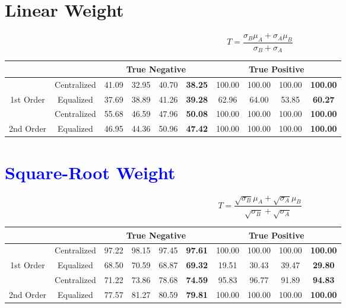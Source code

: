 \documentclass[10pt,a4paper]{article}
\begin{document}
	
	\section{Linear Weight}
		$$T = \frac{\sigma_B \mu_A + \sigma_A \mu_B}{\sigma_B + \sigma_A}$$
		
		\begin{table}[!h]
			\centering
			\begin{tabular}{|c|c|c|c|c|c|c|c|c|c|}
				\hline
				&             & \multicolumn{4}{c|}{True Negative}                            & \multicolumn{4}{c|}{True Positive}                                \\ \hline
				& Centralized & 41.09 & 32.95 & 40.70 & {\color[HTML]{FE0000} \textbf{38.25}} & 100.00 & 100.00 & 100.00 & {\color[HTML]{FE0000} \textbf{100.00}} \\ \cline{2-10} 
				\multirow{-2}{*}{1st Order} & Equalized   & 37.69 & 38.89 & 41.26 & {\color[HTML]{FE0000} \textbf{39.28}} & 62.96  & 64.00  & 53.85  & {\color[HTML]{FE0000} \textbf{60.27}}  \\ \hline
				& Centralized & 55.68 & 46.59 & 47.96 & {\color[HTML]{FE0000} \textbf{50.08}} & 100.00 & 100.00 & 100.00 & {\color[HTML]{FE0000} \textbf{100.00}} \\ \cline{2-10} 
				\multirow{-2}{*}{2nd Order} & Equalized   & 46.95 & 44.36 & 50.96 & {\color[HTML]{FE0000} \textbf{47.42}} & 100.00 & 100.00 & 100.00 & {\color[HTML]{FE0000} \textbf{100.00}} \\ \hline
			\end{tabular}
		\end{table}
	
	\section{\textcolor{blue}{Square-Root Weight}}
		$$T = \frac{\sqrt{\sigma_B} \mu_A + \sqrt{\sigma_A} \mu_B}{\sqrt{\sigma_B} + \sqrt{\sigma_A}}$$
		\begin{table}[!h]
			\centering
			\begin{tabular}{|c|c|c|c|c|c|c|c|c|c|}
				\hline
				&             & \multicolumn{4}{c|}{True Negative}                            & \multicolumn{4}{c|}{True Positive}                                \\ \hline
				& Centralized & 97.22 & 98.15 & 97.45 & {\color[HTML]{FE0000} \textbf{97.61}} & 100.00 & 100.00 & 100.00 & {\color[HTML]{FE0000} \textbf{100.00}} \\ \cline{2-10} 
				\multirow{-2}{*}{1st Order} & Equalized   & 68.50 & 70.59 & 68.87 & {\color[HTML]{FE0000} \textbf{69.32}} & 19.51  & 30.43  & 39.47  & {\color[HTML]{FE0000} \textbf{29.80}}  \\ \hline
				& Centralized & 71.22 & 73.86 & 78.68 & {\color[HTML]{FE0000} \textbf{74.59}} & 95.83  & 96.77  & 91.89  & {\color[HTML]{FE0000} \textbf{94.83}}  \\ \cline{2-10} 
				\multirow{-2}{*}{2nd Order} & Equalized   & 77.57 & 81.27 & 80.59 & {\color[HTML]{FE0000} \textbf{79.81}} & 100.00 & 100.00 & 100.00 & {\color[HTML]{FE0000} \textbf{100.00}} \\ \hline
			\end{tabular}
		\end{table}
		
\end{document}
